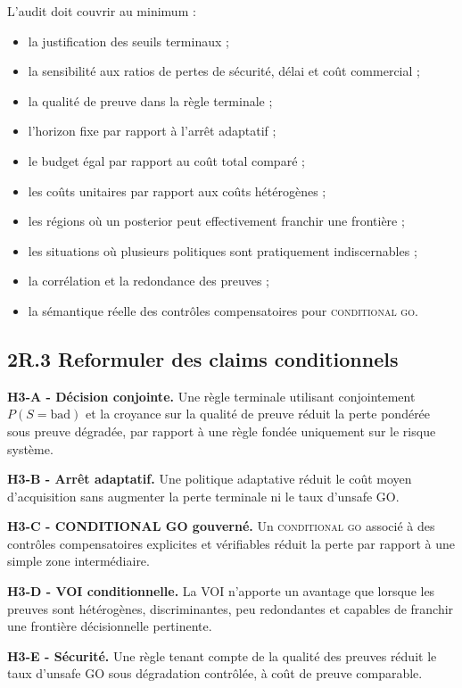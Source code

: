 \documentclass[11pt,a4paper]{article}
\newcommand{\cgo}{\textsc{conditional go}}
\begin{document}
L'audit doit couvrir au minimum :
\begin{itemize}
  \item la justification des seuils terminaux ;
  \item la sensibilité aux ratios de pertes de sécurité, délai et coût commercial ;
  \item la qualité de preuve dans la règle terminale ;
  \item l'horizon fixe par rapport à l'arrêt adaptatif ;
  \item le budget égal par rapport au coût total comparé ;
  \item les coûts unitaires par rapport aux coûts hétérogènes ;
  \item les régions où un posterior peut effectivement franchir une frontière ;
  \item les situations où plusieurs politiques sont pratiquement indiscernables ;
  \item la corrélation et la redondance des preuves ;
  \item la sémantique réelle des contrôles compensatoires pour \cgo{}.
\end{itemize}

\subsection{2R.3 Reformuler des claims conditionnels}

\textbf{H3-A - Décision conjointe.} Une règle terminale utilisant conjointement $P(S=\mathrm{bad})$ et la croyance sur la qualité de preuve réduit la perte pondérée sous preuve dégradée, par rapport à une règle fondée uniquement sur le risque système.

\textbf{H3-B - Arrêt adaptatif.} Une politique adaptative réduit le coût moyen d'acquisition sans augmenter la perte terminale ni le taux d'unsafe GO.

\textbf{H3-C - CONDITIONAL GO gouverné.} Un \cgo{} associé à des contrôles compensatoires explicites et vérifiables réduit la perte par rapport à une simple zone intermédiaire.

\textbf{H3-D - VOI conditionnelle.} La VOI n'apporte un avantage que lorsque les preuves sont hétérogènes, discriminantes, peu redondantes et capables de franchir une frontière décisionnelle pertinente.

\textbf{H3-E - Sécurité.} Une règle tenant compte de la qualité des preuves réduit le taux d'unsafe GO sous dégradation contrôlée, à coût de preuve comparable.
\end{document}
